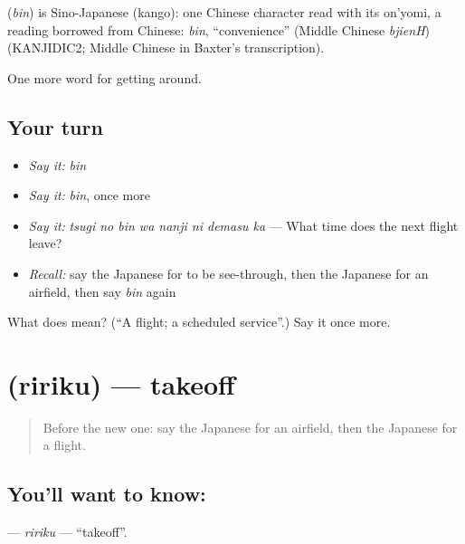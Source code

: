 \begin{cousinweb}
\textbf{} (\emph{bin}) is Sino-Japanese (kango): one Chinese character read with its on'yomi, a reading borrowed from Chinese: \emph{bin}, \textquotedblleft{}convenience\textquotedblright{} (Middle Chinese \emph{bjienH}) (KANJIDIC2; Middle Chinese in Baxter's transcription).
\end{cousinweb}

\begin{grammarlens}[title={What you've built}]
One more word for getting around.
\end{grammarlens}

\subsection*{Your turn}
\begin{itemize}
\raggedright
  \item \emph{Say it:} \emph{bin}
  \item \emph{Say it:} \emph{bin}, once more
  \item \emph{Say it:} \emph{tsugi no bin wa nanji ni demasu ka} — What time does the next flight leave?
  \item \emph{Recall:} say the Japanese for to be see-through, then the Japanese for an airfield, then say \emph{bin} again
\end{itemize}

\begin{tcolorbox}[breakable,colback=teal!4,colframe=teal!35!black,title={Before you move on}]
What does  mean? (\textquotedblleft{}A flight; a scheduled service\textquotedblright{}.) Say it once more.
\end{tcolorbox}
\section[\texorpdfstring{\ja{りりく} (ririku)}{りりく (ririku)}]{ (ririku) — takeoff}

\label{lesson:JA-C384-ririku}



\begin{quote}
Before the new one: say the Japanese for an airfield, then the Japanese for a flight.
\end{quote}

\subsection*{You'll want to know: }
\textbf{} — \emph{ririku} — \textquotedblleft{}takeoff\textquotedblright{}.

